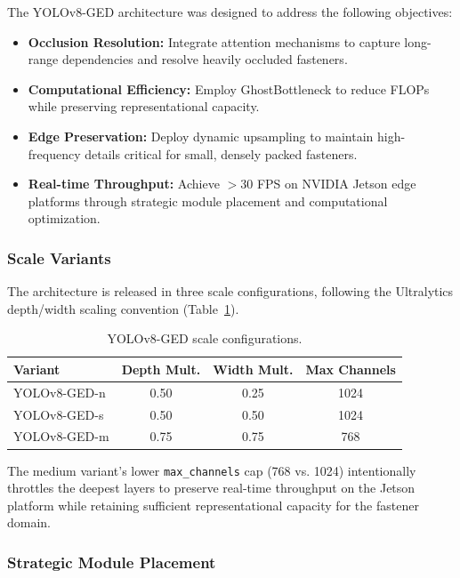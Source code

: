 The YOLOv8-GED architecture was designed to address the following objectives:
\begin{itemize}
    \item \textbf{Occlusion Resolution:} Integrate attention mechanisms to capture long-range dependencies and resolve heavily occluded fasteners.
    \item \textbf{Computational Efficiency:} Employ GhostBottleneck to reduce FLOPs while preserving representational capacity.
    \item \textbf{Edge Preservation:} Deploy dynamic upsampling to maintain high-frequency details critical for small, densely packed fasteners.
    \item \textbf{Real-time Throughput:} Achieve $>30$ FPS on NVIDIA Jetson edge platforms through strategic module placement and computational optimization.
\end{itemize}

\subsubsection{Scale Variants}

The architecture is released in three scale configurations, following the Ultralytics depth/width scaling convention (Table~\ref{tab:scales}).

\begin{table}[htbp]
\centering
\caption{YOLOv8-GED scale configurations.}
\label{tab:scales}
\begin{tabular}{lccc}
\toprule
\textbf{Variant} & \textbf{Depth Mult.} & \textbf{Width Mult.} & \textbf{Max Channels} \\ \midrule
YOLOv8-GED-n & 0.50 & 0.25 & 1024 \\
YOLOv8-GED-s & 0.50 & 0.50 & 1024 \\
YOLOv8-GED-m & 0.75 & 0.75 & 768  \\ \bottomrule
\end{tabular}
\end{table}

The medium variant's lower \texttt{max\_channels} cap (768 vs. 1024) intentionally throttles the deepest layers to preserve real-time throughput on the Jetson platform while retaining sufficient representational capacity for the fastener domain.

\subsubsection{Strategic Module Placement}

